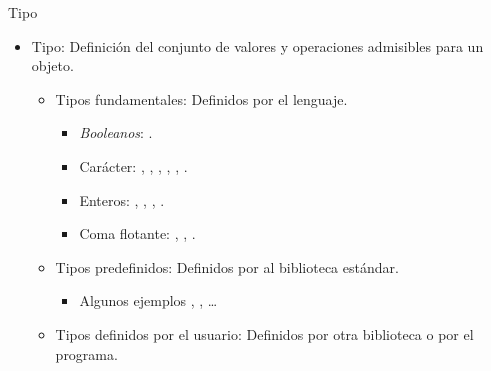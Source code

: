 \begin{frame}{Tipo}
\begin{itemize}
  \item \alert{Tipo}: Definición del conjunto de valores y operaciones admisibles para un objeto.
    \begin{itemize}
      \item \alert{Tipos fundamentales}: Definidos por el lenguaje.
        \begin{itemize}
          \item \alert{\emph{Booleanos}}: .
          \item \alert{Carácter}: , , , , , .
          \item \alert{Enteros}: , , , .
          \item \alert{Coma flotante}: , , .
        \end{itemize}
      \item \alert{Tipos predefinidos}: Definidos por al biblioteca estándar.
        \begin{itemize}
          \item Algunos ejemplos , , \ldots
        \end{itemize}
      \item \alert{Tipos definidos por el usuario}: Definidos por otra biblioteca o por el programa.
    \end{itemize}
\end{itemize}
\end{frame}

